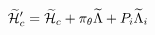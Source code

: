 \begin{equation}
\label{ext-mH} \widetilde{\cal H}'_c = \widetilde{\cal H}_c +
\pi_\theta \widetilde{\Lambda}+P_i\widetilde{\Lambda}_i
\end{equation}


